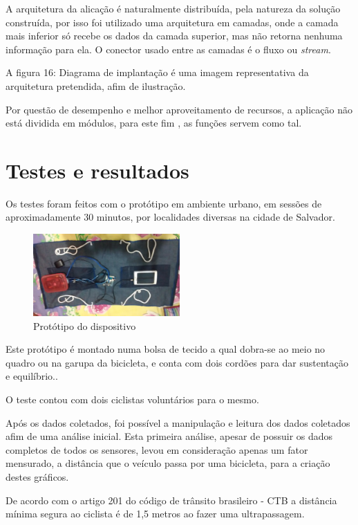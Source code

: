 \documentclass[final,12pt, times, 5p, twocolumn]{elsarticle}
\begin{document}
A arquitetura da alicação é naturalmente distribuída, pela natureza da solução construída, por isso foi utilizado uma arquitetura em camadas, onde a camada mais inferior só recebe os dados da camada superior, mas não retorna nenhuma informação para ela. O conector usado entre as camadas é o fluxo ou \textit{stream}.

A figura 16: Diagrama de implantação é uma imagem representativa da arquitetura pretendida, afim de ilustração.

Por questão de desempenho e melhor aproveitamento de recursos, a aplicação não está dividida em módulos, para este fim , as funções servem como tal.

\section{Testes e resultados}

Os testes foram feitos com o protótipo em ambiente urbano, em sessões de aproximadamente 30 minutos, por localidades diversas na cidade de Salvador.

\begin{figure}[ht!]
\centering
\includegraphics[width=0.5\textwidth]{prototipo.jpg}
\caption{\label{fig:prototipo}Protótipo do dispositivo}
\end{figure}

Este protótipo é montado numa bolsa de tecido a qual dobra-se ao meio no quadro ou na garupa da bicicleta, e conta com dois cordões para dar sustentação e equilíbrio..

O teste contou com dois ciclistas voluntários para o mesmo.

Após os dados coletados, foi possível a manipulação e leitura dos  dados coletados afim de uma análise inicial. Esta primeira análise, apesar de possuir os dados completos de todos os sensores, levou em consideração apenas um fator mensurado, a distância que o veículo passa por uma bicicleta, para a criação destes gráficos. 

De acordo com o artigo 201 do código de trânsito brasileiro - CTB a distância mínima segura ao ciclista é de 1,5 metros ao fazer uma ultrapassagem.
\end{document}
